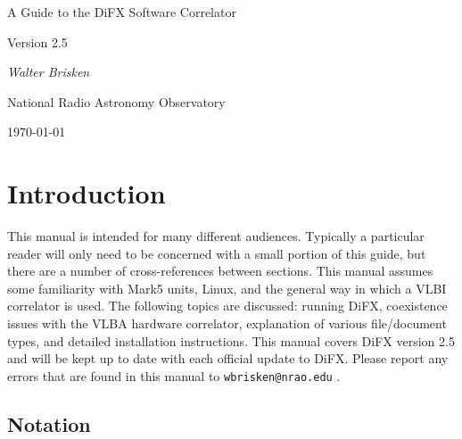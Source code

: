 \documentclass{article}
\begin{document}
\newcommand{\Oa}[1]{\hspace{-12pt}\makebox[12pt]{$\star$}#1}
\newcommand{\Da}[1]{\hspace{-12pt}\makebox[12pt]{$\times$}#1}
\newcommand{\bfit}[1]{{\textrm{\textit{\textmd{#1}}}}}


\begin{center}

\vspace{5pt}

{\LARGE A Guide to the DiFX Software Correlator}

\vspace{5pt}

{\Large Version 2.5}


\vspace{10pt}

{\it Walter Brisken}

\vspace{5pt}

National Radio Astronomy Observatory

\vspace{5pt}
\today

\end{center}

\tableofcontents

\section{Introduction}

This manual is intended for many different audiences.
Typically a particular reader will only need to be concerned with a small portion of this guide, but there are a number of cross-references between sections.
This manual assumes some familiarity with Mark5 units, Linux, and the general way in which a VLBI correlator is used.
The following topics are discussed: running DiFX, coexistence issues with the VLBA hardware correlator, explanation of various file/document types, and detailed installation instructions.
This manual covers DiFX version 2.5 and will be kept up to date with each official update to DiFX.
Please report any errors that are found in this manual to {\tt wbrisken@nrao.edu} .

\subsection{Notation}
\end{document}

